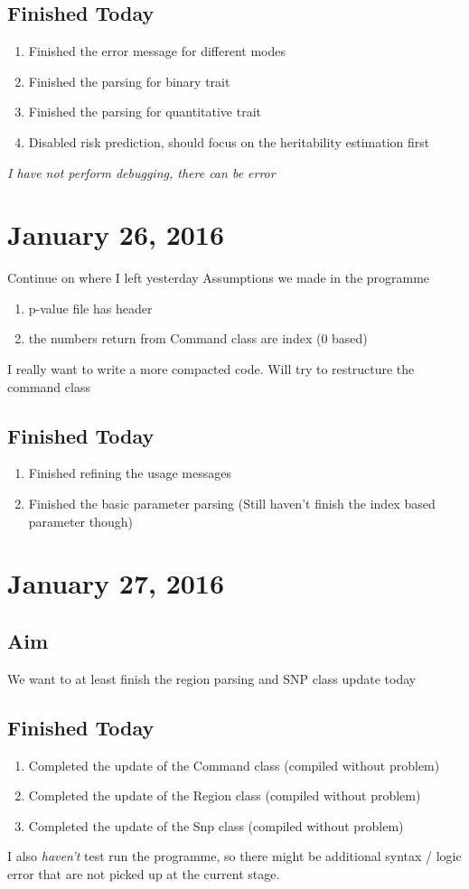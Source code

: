 \documentclass[12pt]{article}
\begin{document}
	\subsection{Finished Today}
	\begin{enumerate}
		\item Finished the error message for different modes
		\item Finished the parsing for binary trait
		\item Finished the parsing for quantitative trait
		\item Disabled risk prediction, should focus on the heritability estimation first
	\end{enumerate}
	\emph{I have not perform debugging, there can be error}
	\section{January 26, 2016}
	Continue on where I left yesterday
	Assumptions we made in the programme
	\begin{enumerate}
		\item p-value file has header
		\item the numbers return from Command class are index (0 based)
	\end{enumerate}
	I really want to write a more compacted code.
	Will try to restructure the command class
	\subsection{Finished Today}
	\begin{enumerate}
		\item Finished refining the usage messages
		\item Finished the basic parameter parsing (Still haven't finish the index based parameter though)
	\end{enumerate}
	\section{January 27, 2016}
	\subsection{Aim}
	We want to at least finish the region parsing and SNP class update today
	\subsection{Finished Today}
	\begin{enumerate}
		\item Completed the update of the Command class (compiled without problem)
		\item Completed the update of the Region class (compiled without problem)
		\item Completed the update of the Snp class (compiled without problem)
	\end{enumerate}
	I also \emph{haven't} test run the programme, so there might be additional syntax / logic error that are not picked up at the current stage.
	
\end{document}
